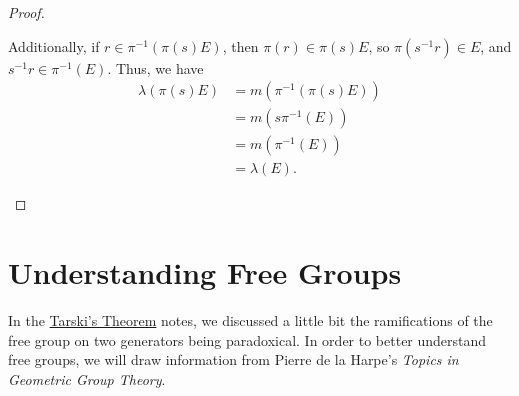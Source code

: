 \documentclass[10pt]{mypackage}
\begin{document}
\begin{proof}
\begin{enumerate}[(1)]
      Additionally, if $r\in \pi^{-1}\left(\pi\left(s\right)E\right)$, then $\pi\left(r\right) \in \pi\left(s\right)E $, so $\pi\left(s^{-1}r\right)\in E$, and $s^{-1}r\in \pi^{-1}\left(E\right)$. Thus, we have
      \begin{align*}
        \lambda\left(\pi\left(s\right)E\right) &= m\left(\pi^{-1}\left(\pi\left(s\right)E\right)\right)\\
                                               &= m\left(s\pi^{-1}\left(E\right)\right)\\
                                               &= m\left(\pi^{-1}\left(E\right)\right)\\
                                               &= \lambda\left(E\right).
      \end{align*}
      
  \end{enumerate}
\end{proof}
\section{Understanding Free Groups}%
In the \href{https://blog.avinashiyer.xyz/Classes_and_Homework/College/Y4/Honors\%20Thesis/amenability_notes.pdf}{Tarski's Theorem} notes, we discussed a little bit the ramifications of the free group on two generators being paradoxical. In order to better understand free groups, we will draw information from Pierre de la Harpe's \textit{Topics in Geometric Group Theory}.
\end{document}
